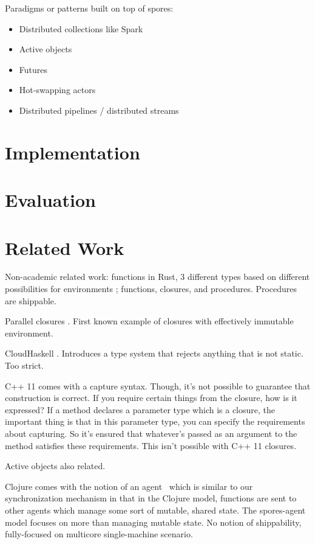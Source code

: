 \documentclass{llncs}
\begin{document}
Paradigms or patterns built on top of spores:

\begin{itemize}
\item Distributed collections like Spark
\item Active objects
\item Futures
\item Hot-swapping actors
\item Distributed pipelines / distributed streams
\end{itemize}

\section{Implementation}

\section{Evaluation}

%

\section{Related Work}

Non-academic related work: functions in Rust, 3 different types based on
different possibilities for environments \cite{RustFunctions}; functions,
closures, and procedures. Procedures are shippable.

Parallel closures \cite{ParallelClosures}. First known example of closures
with effectively immutable environment.

CloudHaskell \cite{CloudHaskell}. Introduces a type system that rejects anything
that is not static. Too strict.

C++ 11 comes with a capture syntax. Though, it's not possible to guarantee that construction is correct. If you require certain things from the closure, how is it expressed? If a method declares a parameter type which is a closure, the important thing is that in this parameter type, you can specify the requirements about capturing. So it's ensured that whatever's passed as an argument to the method satisfies these requirements. This isn't possible with C++ 11 closures. \cite{Cplusplus11Spec}

Active objects also related. \cite{ActiveObjects}

Clojure comes with the notion of an agent~\cite{Clojure} which is similar to our synchronization mechanism in that in the Clojure model, functions are sent to other agents which manage some sort of mutable, shared state. The spores-agent model focuses on more than managing mutable state. No notion of shippability, fully-focused on multicore single-machine scenario.



\end{document}
